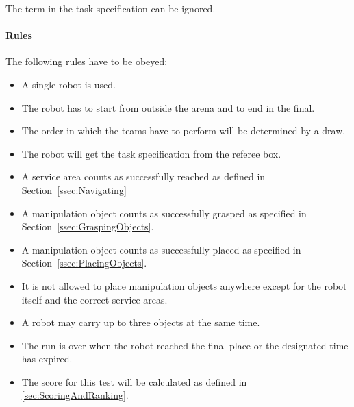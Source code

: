 The term  in the task specification can be ignored.

%

\paragraph{Rules}
The following rules have to be obeyed:

\begin{itemize}
\item A single robot is used.
\item The robot has to start from outside the arena and to end in the final.
\item The order in which the teams have to perform will be determined by a draw.
\item The robot will get the task specification from the referee box.
\item A service area counts as successfully reached as defined in Section~\ref{ssec:Navigating}
\item A manipulation object counts as successfully grasped as specified in Section~\ref{ssec:GraspingObjects}.
\item A manipulation object counts as successfully placed as specified in Section~\ref{ssec:PlacingObjects}.
\item It is not allowed to place manipulation objects anywhere except for the robot itself and the correct service areas.
\item A robot may carry up to three objects at the same time.
\item The run is over when the robot reached the final place or the designated time has expired.
\item The score for this test will be calculated as defined in \ref{sec:ScoringAndRanking}.

\end{itemize}


%
%
%
